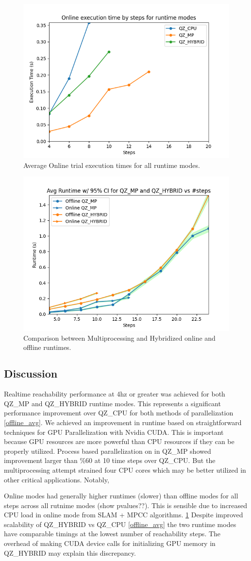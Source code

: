 \documentclass[runningheads]{llncs}
\begin{document}
\begin{figure}[t]
\includegraphics[width=.5\textwidth]{profiler_out/online_avg_unified.png}
\caption{Average Online trial execution times for all runtime modes.} \label{online_avg}
\end{figure}
\begin{figure}[t]
\includegraphics[width=.5\textwidth]{profiler_out/avg_mp_hybrid_CI.png}
\caption{Comparison between Multiprocessing and Hybridized online and offline runtimes.} \label{mp_hybrid_ci}
\end{figure}

\subsection{Discussion}

Realtime reachability performance at 4hz or greater was achieved for both QZ\_MP and QZ\_HYBRID runtime modes. This represents a significant performance improvement over QZ\_CPU for both methods of parallelization \ref{offline_avg}. We achieved an improvement in runtime based on straightforward techniques for GPU Parallelization with Nvidia CUDA. This is important because GPU resources are more powerful than CPU resources if they can be properly utilized. Process based parallelization on in QZ\_MP showed improvement larger than \%60 at 10 time steps over QZ\_CPU. But the multiprocessing attempt strained four CPU cores which may be better utilized in other critical applications. Notably, 

Online modes had generally higher runtimes (slower) than offline modes for all steps across all rutnime modes (show pvalues??). This is sensible due to increased CPU load in online mode from SLAM + MPCC algorithms. \ref{online_avg} Despite improved scalability of QZ\_HYBRID vs QZ\_CPU \ref{offline_avg} the two runtime modes have comparable timings at the lowest number of reachability steps. The overhead of making CUDA device calls for initializing GPU memory in QZ\_HYBRID may explain this discrepancy.
\end{document}
